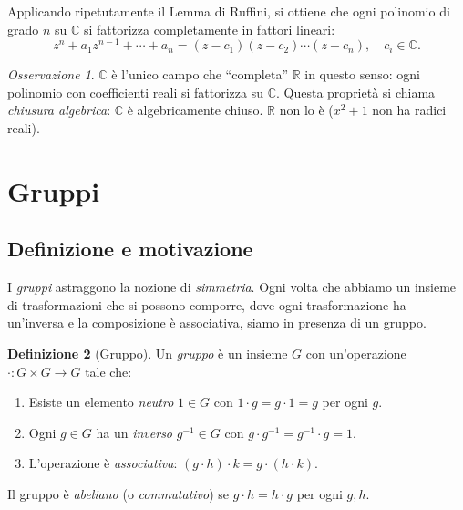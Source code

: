 \documentclass[11pt, a4paper]{book}
\theoremstyle{definition}
\newtheorem{definizione}{Definizione}[section]
\theoremstyle{plain}
\theoremstyle{remark}
\newtheorem{osservazione}[definizione]{Osservazione}
\newcommand{\R}{\mathbb{R}}
\newcommand{\C}{\mathbb{C}}
\begin{document}
Applicando ripetutamente il Lemma di Ruffini, si ottiene che ogni polinomio di grado $n$ su $\C$ si fattorizza completamente in fattori lineari:
\[
  z^n + a_1 z^{n-1} + \cdots + a_n = (z - c_1)(z - c_2) \cdots (z - c_n), \quad c_i \in \C.
\]

\begin{osservazione}
$\C$ è l'unico campo che ``completa'' $\R$ in questo senso: ogni polinomio con coefficienti reali si fattorizza su $\C$. Questa proprietà si chiama \emph{chiusura algebrica}: $\C$ è algebricamente chiuso. $\R$ non lo è ($x^2 + 1$ non ha radici reali).
\end{osservazione}

\section{Gruppi}

\subsection{Definizione e motivazione}

I \emph{gruppi} astraggono la nozione di \emph{simmetria}. Ogni volta che abbiamo un insieme di trasformazioni che si possono comporre, dove ogni trasformazione ha un'inversa e la composizione è associativa, siamo in presenza di un gruppo.

\begin{defbox}
\begin{definizione}[Gruppo]
Un \emph{gruppo} è un insieme $G$ con un'operazione $\cdot \colon G \times G \to G$ tale che:
\begin{enumerate}
  \item Esiste un elemento \emph{neutro} $1 \in G$ con $1 \cdot g = g \cdot 1 = g$ per ogni $g$.
  \item Ogni $g \in G$ ha un \emph{inverso} $g^{-1} \in G$ con $g \cdot g^{-1} = g^{-1} \cdot g = 1$.
  \item L'operazione è \emph{associativa}: $(g \cdot h) \cdot k = g \cdot (h \cdot k)$.
\end{enumerate}
Il gruppo è \emph{abeliano} (o \emph{commutativo}) se $g \cdot h = h \cdot g$ per ogni $g, h$.
\end{definizione}
\end{defbox}
\end{document}
